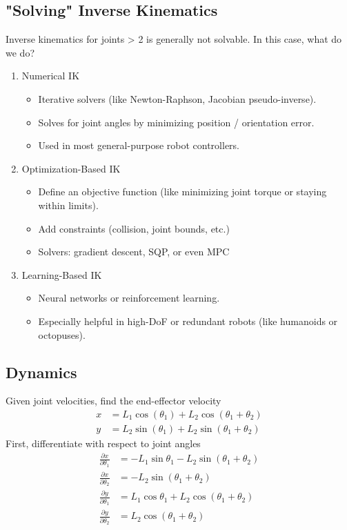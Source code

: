 \documentclass[10pt]{article}
\begin{document}
\subsection*{"Solving" Inverse Kinematics}
Inverse kinematics for joints > 2 is generally not solvable.  In this case, what do we do?
\begin{enumerate}
    \item Numerical IK
    \begin{itemize}
        \item Iterative solvers (like Newton-Raphson, Jacobian pseudo-inverse).
        \item Solves for joint angles by minimizing position / orientation error.
        \item Used in most general-purpose robot controllers.
    \end{itemize}
    \item Optimization-Based IK
    \begin{itemize}
        \item Define an objective function (like minimizing joint torque or staying within limits).
        \item Add constraints (collision, joint bounds, etc.)
        \item Solvers: gradient descent, SQP, or even MPC
    \end{itemize}
    \item Learning-Based IK
    \begin{itemize}
        \item Neural networks or reinforcement learning.
        \item Especially helpful in high-DoF or redundant robots (like humanoids or octopuses).
    \end{itemize}
\end{enumerate}

\subsection*{Dynamics}
Given joint velocities, find the end-effector velocity
\begin{align*}
    x &= L_1 \cos(\theta_1) + L_2 \cos(\theta_1 + \theta_2)\\
    y &= L_2 \sin(\theta_1) + L_2 \sin(\theta_1 + \theta_2)
\end{align*}
First, differentiate with respect to joint angles
\begin{align*}
    \frac{\partial x}{\partial \theta_1} &= -L_1 \sin \theta_1 - L_2 \sin(\theta_1 + \theta_2)\\
    \frac{\partial x}{\partial \theta_2} &= -L_2 \sin(\theta_1 + \theta_2)\\
    \frac{\partial y}{\partial \theta_1} &= L_1 \cos \theta_1 + L_2 \cos(\theta_1 + \theta_2)\\
    \frac{\partial y}{\partial \theta_2} &= L_2 \cos(\theta_1 + \theta_2)
\end{align*}
\end{document}
